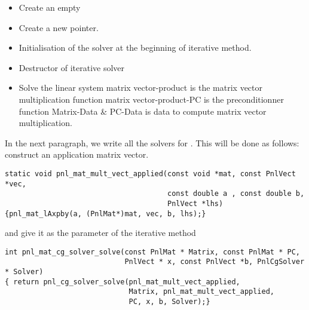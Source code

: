 \begin{itemize}
  \item {}
    \sshortdescribe Create an empty   
\item {}
  \sshortdescribe Create a new  pointer.  
\item {}
  \sshortdescribe Initialisation of the solver at the beginning of iterative method.  
\item {}
  \sshortdescribe Destructor of iterative solver  
\item {}
  \sshortdescribe Solve the linear system matrix vector-product is the matrix vector multiplication function matrix vector-product-PC is the preconditionner function Matrix-Data \& PC-Data is data to compute matrix vector multiplication.  
\end{itemize}


In the next paragraph, we write all the solvers for . This
will be done as follows: construct an application matrix vector.
\begin{verbatim}
static void pnl_mat_mult_vect_applied(const void *mat, const PnlVect *vec, 
                                      const double a , const double b, 
                                      PnlVect *lhs)
{pnl_mat_lAxpby(a, (PnlMat*)mat, vec, b, lhs);}
\end{verbatim}
and give it as the parameter of the iterative method
\begin{verbatim}
int pnl_mat_cg_solver_solve(const PnlMat * Matrix, const PnlMat * PC, 
                            PnlVect * x, const PnlVect *b, PnlCgSolver * Solver)
{ return pnl_cg_solver_solve(pnl_mat_mult_vect_applied, 
                             Matrix, pnl_mat_mult_vect_applied, 
                             PC, x, b, Solver);}
\end{verbatim}

